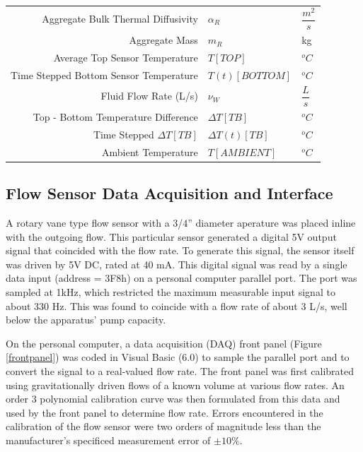 \begin{table}[ht!]
\begin{tabular}{r l l}
Aggregate Bulk Thermal Diffusivity		&	$\alpha_{R}$		& $\dfrac{m^{2}}{s}$\\[3mm]

Aggregate Mass					&	$m_{R}$			& kg\\[3mm]

Average Top Sensor Temperature 			&	$T[TOP]$		& $^{o}C$\\[3mm]

Time Stepped Bottom Sensor Temperature 		&	$T(t)[BOTTOM]$		& $^{o}C$\\[3mm]	

Fluid Flow Rate (L/s)				&	$\nu_{W}$		& $\dfrac{L}{s}$\\[3mm]

Top - Bottom Temperature Difference 		&	$\Delta T[TB]$		& $^{o}C$\\[3mm]

Time Stepped $\Delta T[TB]$ 			&	$\Delta T(t)[TB]$	& $^{o}C$\\[3mm]

Ambient Temperature				&	$T[AMBIENT]$		& $^{o}C$\\[3mm]

\hline
\end{tabular}
\end{table} 

\subsection{Flow Sensor Data Acquisition and Interface}
A rotary vane type flow sensor with a 3/4'' diameter aperature was placed inline with the outgoing flow. This particular sensor generated a digital 5V output signal that coincided with the flow rate. To generate this signal, the sensor itself was driven by 5V DC, rated at 40 mA. This digital signal was read by a single data input (address = 3F8h) on a personal computer parallel port. The port was sampled at 1kHz, which restricted the maximum measurable input signal to about 330 Hz. This was found to coincide with a flow rate of about 3 L/s, well below the apparatus' pump capacity.

On the personal computer, a data acquisition (DAQ) front panel (Figure \ref{frontpanel}) was coded in Visual Basic (6.0) to sample the parallel port and to convert the signal to a real-valued flow rate. The front panel was first calibrated using gravitationally driven flows of a known volume at various flow rates. An order 3 polynomial calibration curve was then formulated from this data and used by the front panel to determine flow rate. Errors encountered in the calibration of the flow sensor were two orders of magnitude less than the manufacturer's specificed measurement error of $\pm10\%$. 

